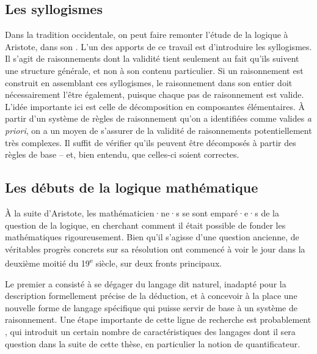 \subsection{Les syllogismes}
Dans la tradition occidentale, on peut faire remonter l’étude de
la logique à Aristote, dans son \cite{Organon}.
L’un des apports de ce travail est d’introduire les syllogismes.
Il s’agit de raisonnements dont la validité tient seulement au fait qu’ils
suivent une structure générale, et non à son contenu particulier.
Si un raisonnement est construit en assemblant ces syllogismes,
le raisonnement dans son entier doit nécessairement l’être également, puisque
chaque pas de raisonnement est valide.
L’idée importante ici est celle de décomposition en composantes élémentaires. À
partir d’un système de règles de raisonnement qu’on a identifiées comme valides 
\textit{a priori},
on a un moyen de s’assurer de la validité de raisonnements potentiellement
très complexes.
Il suffit de vérifier qu’ils peuvent être décomposés à partir
des règles de base – et, bien entendu, que celles-ci soient correctes.

\subsection{Les débuts de la logique mathématique}
À la suite d’Aristote, les mathématicien·ne·s se sont emparé·e·s de la question
de la logique, en cherchant comment il était possible de fonder les mathématiques
rigoureusement. Bien qu’il s’agisse d’une question ancienne, de véritables
progrès concrets sur sa résolution ont commencé à voir le jour dans la deuxième
moitié du 19\textsuperscript{e} siècle, sur deux fronts principaux.

Le premier a consisté à se dégager du langage dit
naturel, inadapté pour la description formellement précise de la déduction, et à
concevoir à la place une nouvelle forme de langage spécifique qui puisse servir de
base à un système de raisonnement. Une étape importante
de cette ligne de recherche est
probablement , qui introduit un certain nombre de
caractéristiques des langages dont il sera question dans la suite de cette thèse,
en particulier la notion de quantificateur.

